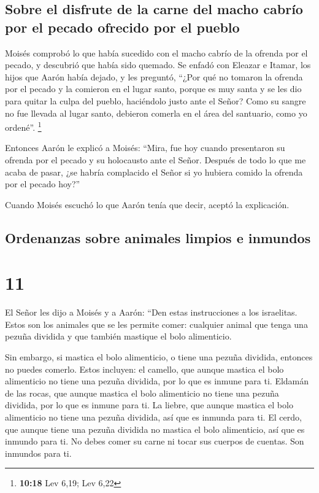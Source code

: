 \hypertarget{sobre-el-disfrute-de-la-carne-del-macho-cabruxedo-por-el-pecado-ofrecido-por-el-pueblo}{%
\subsection{Sobre el disfrute de la carne del macho cabrío por el pecado
ofrecido por el
pueblo}\label{sobre-el-disfrute-de-la-carne-del-macho-cabruxedo-por-el-pecado-ofrecido-por-el-pueblo}}

 Moisés comprobó lo que había sucedido con el macho
cabrío de la ofrenda por el pecado, y descubrió que había sido quemado.
Se enfadó con Eleazar e Itamar, los hijos que Aarón había dejado, y les
preguntó,  ``¿Por qué no tomaron la ofrenda por el pecado
y la comieron en el lugar santo, porque es muy santa y se les dio para
quitar la culpa del pueblo, haciéndolo justo ante el Señor?
 Como su sangre no fue llevada al lugar santo, debieron
comerla en el área del santuario, como yo ordené''. \footnote{\textbf{10:18}
  Lev 6,19; Lev 6,22}

 Entonces Aarón le explicó a Moisés: ``Mira, fue hoy
cuando presentaron su ofrenda por el pecado y su holocausto ante el
Señor. Después de todo lo que me acaba de pasar, ¿se habría complacido
el Señor si yo hubiera comido la ofrenda por el pecado hoy?''

 Cuando Moisés escuchó lo que Aarón tenía que decir,
aceptó la explicación.

\hypertarget{ordenanzas-sobre-animales-limpios-e-inmundos}{%
\subsection{Ordenanzas sobre animales limpios e
inmundos}\label{ordenanzas-sobre-animales-limpios-e-inmundos}}

\hypertarget{section-10}{%
\section{11}\label{section-10}}

 El Señor les dijo a Moisés y a Aarón: 
``Den estas instrucciones a los israelitas. Estos son los animales que
se les permite comer:  cualquier animal que tenga una
pezuña dividida y que también mastique el bolo alimenticio.

 Sin embargo, si mastica el bolo alimenticio, o tiene una
pezuña dividida, entonces no puedes comerlo. Estos incluyen: el camello,
que aunque mastica el bolo alimenticio no tiene una pezuña dividida, por
lo que es inmune para ti.  Eldamán de las rocas, que
aunque mastica el bolo alimenticio no tiene una pezuña dividida, por lo
que es inmune para ti.  La liebre, que aunque mastica el
bolo alimenticio no tiene una pezuña dividida, así que es inmunda para
ti.  El cerdo, que aunque tiene una pezuña dividida no
mastica el bolo alimenticio, así que es inmundo para ti. 
No debes comer su carne ni tocar sus cuerpos de cuentas. Son inmundos
para ti.

